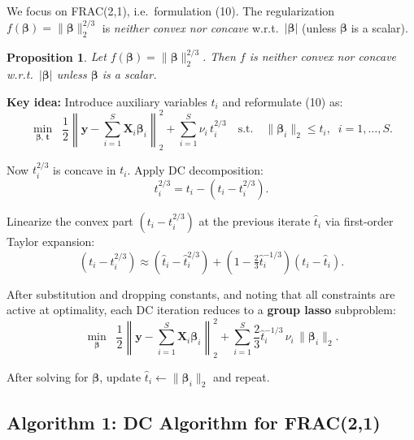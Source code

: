 \documentclass[11pt,a4paper]{article}
\newtheorem{proposition}{Proposition}
\begin{document}
We focus on FRAC(2,1), i.e.\ formulation (10). The regularization $f(\boldsymbol{\beta}) = \|\boldsymbol{\beta}\|_2^{2/3}$ is \emph{neither convex nor concave} w.r.t.\ $|\boldsymbol{\beta}|$ (unless $\boldsymbol{\beta}$ is a scalar).

\begin{proposition}
Let $f(\boldsymbol{\beta}) = \|\boldsymbol{\beta}\|_2^{2/3}$. Then $f$ is neither convex nor concave w.r.t.\ $|\boldsymbol{\beta}|$ unless $\boldsymbol{\beta}$ is a scalar.
\end{proposition}

\noindent\textbf{Key idea:} Introduce auxiliary variables $t_i$ and reformulate (10) as:
\begin{equation}
\min_{\boldsymbol{\beta},\,\mathbf{t}} \;\;
\frac{1}{2}\left\|\mathbf{y} - \sum_{i=1}^{S}\mathbf{X}_i\boldsymbol{\beta}_i\right\|_2^2
+ \sum_{i=1}^{S}\nu_i\, t_i^{2/3}
\quad\text{s.t.}\quad \|\boldsymbol{\beta}_i\|_2 \leq t_i,\;\; i=1,\ldots,S.
\end{equation}

Now $t_i^{2/3}$ is concave in $t_i$. Apply DC decomposition:
\[
t_i^{2/3} = t_i - \left(t_i - t_i^{2/3}\right).
\]

Linearize the convex part $\left(t_i - t_i^{2/3}\right)$ at the previous iterate $\hat{t}_i$ via first-order Taylor expansion:
\[
\left(t_i - t_i^{2/3}\right) \approx \left(\hat{t}_i - \hat{t}_i^{2/3}\right) + \left(1 - \tfrac{2}{3}\hat{t}_i^{-1/3}\right)(t_i - \hat{t}_i).
\]

After substitution and dropping constants, and noting that all constraints are active at optimality, each DC iteration reduces to a \textbf{group lasso} subproblem:
\begin{equation}
\min_{\boldsymbol{\beta}} \;\;
\frac{1}{2}\left\|\mathbf{y} - \sum_{i=1}^{S}\mathbf{X}_i\boldsymbol{\beta}_i\right\|_2^2
+ \sum_{i=1}^{S} \frac{2}{3}\hat{t}_i^{-1/3}\,\nu_i\,\|\boldsymbol{\beta}_i\|_2.
\end{equation}

After solving for $\boldsymbol{\beta}$, update $\hat{t}_i \leftarrow \|\boldsymbol{\beta}_i\|_2$ and repeat.

\subsection{Algorithm 1: DC Algorithm for FRAC(2,1)}
\end{document}
